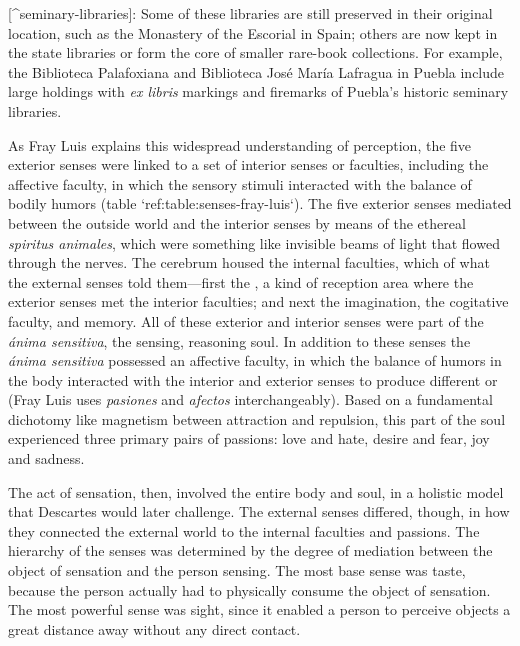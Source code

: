 [^seminary-libraries]: Some of these libraries are still preserved in their original location, such as the Monastery of the Escorial in Spain; others are now kept in the state libraries or form the core of smaller rare-book collections.
For example, the Biblioteca Palafoxiana and Biblioteca José María Lafragua in Puebla include large holdings with \emph{ex libris} markings and firemarks of Puebla's historic seminary libraries.


As Fray Luis explains this widespread understanding of perception, the five exterior senses were linked to a set of interior senses or faculties, including the affective faculty, in which the sensory stimuli interacted with the balance of bodily humors (table `ref:table:senses-fray-luis`).
\Autocite[ch. 27--35, pp. 439--494]{LuisdeGranada-Balcells:SimboloPtI}
The five exterior senses mediated between the outside world and the interior senses by means of the ethereal \emph{spiritus animales}, which were something like invisible beams of light that flowed through the nerves.
The cerebrum housed the internal faculties, which  of what the external senses told them---first the , a kind of reception area where the exterior senses met the interior faculties; and next the imagination, the cogitative faculty, and memory.
All of these exterior and interior senses were part of the \emph{ánima sensitiva}, the sensing, reasoning soul.
In addition to these senses the \emph{ánima sensitiva} possessed an affective faculty, in which the balance of humors in the body interacted with the interior and exterior senses to produce different  or  (Fray Luis uses \emph{pasiones} and \emph{afectos} interchangeably).
Based on a fundamental dichotomy like magnetism between attraction and repulsion, this  part of the soul experienced three primary pairs of passions: love and hate, desire and fear, joy and sadness.

\label{table:senses-fray-luis}

The act of sensation, then, involved the entire body and soul, in a holistic model that Descartes would later challenge.
The external senses differed, though, in how they connected the external world to the internal faculties and passions.
The hierarchy of the senses was determined by the degree of mediation between the object of sensation and the person sensing.
The most base sense was taste, because the person actually had to physically consume the object of sensation.
The most powerful sense was sight, since it enabled a person to perceive objects a great distance away without any direct contact.

